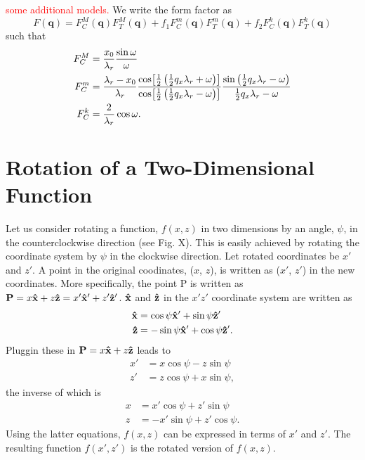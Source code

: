 \textcolor{red}{some additional models.} We write the form factor as
\begin{equation}
  F(\mathbf{q}) = F_C^M(\mathbf{q})F_T^M(\mathbf{q}) 
  + f_1F_C^m(\mathbf{q})F_T^m(\mathbf{q}) 
  + f_2F_C^k(\mathbf{q})F_T^k(\mathbf{q})
\end{equation}
such that
\begin{align}
  F_C^M &= \frac{x_0}{\lambda_r}\frac{\sin\omega}{\omega} \\
  F_C^m &= \frac{\lambda_r-x_0}{\lambda_r}
  \frac{\cos\mathopen{}\left[ \frac{1}{2}\left(\frac{1}{2}q_x\lambda_r + \omega\right) \right]\mathclose{}}
       {\cos\mathopen{}\left[ \frac{1}{2}\left(\frac{1}{2}q_x\lambda_r - \omega\right) \right]\mathclose{}}
  \frac{\sin\left(\frac{1}{2}q_x\lambda_r - \omega\right)}
       {\frac{1}{2}q_x\lambda_r - \omega} \\
  F_C^k &= \frac{2}{\lambda_r}\cos\omega.
\end{align}

\newpage
\section{Rotation of a Two-Dimensional Function}
Let us consider rotating a function, $f(x,z)$ in two dimensions by an angle, 
$\psi$, in the counterclockwise direction (see Fig. X). This is easily 
achieved by rotating the coordinate system by $\psi$ in the clockwise direction. 
Let rotated coordinates be $x'$ and $z'$. A point in the original coodinates,
($x$, $z$), is written as ($x'$, $z'$) in the new coordinates. More specifically,
the point P is written as 
$\mathbf{P}=x\mathbf{\hat{x}}+z\mathbf{\hat{z}}=x'\mathbf{\hat{x}}'+z'\mathbf{\hat{z}}'$. $\mathbf{\hat{x}}$ and $\mathbf{\hat{z}}$ in
the $x'z'$ coordinate system are written as 
\begin{align}
  \mathbf{\hat{x}} &= \cos\psi\mathbf{\hat{x}}'+\sin\psi\mathbf{\hat{z}}' \\
  \mathbf{\hat{z}} &= -\sin\psi\mathbf{\hat{x}}'+\cos\psi\mathbf{\hat{z}}'.
\end{align}
Pluggin these in $\mathbf{P}=x\mathbf{\hat{x}}+z\mathbf{\hat{z}}$ leads to
\begin{align}
  x' &= x\cos\psi - z\sin\psi \\
  z' &= z\cos\psi + x\sin\psi,
\end{align}
the inverse of which is
\begin{align}
  x &= x'\cos\psi + z'\sin\psi \\
  z &= -x'\sin\psi + z'\cos\psi.
\end{align}
Using the latter equations, $f(x,z)$ can be expressed in terms of $x'$ and $z'$. 
The resulting function $f(x',z')$ is the rotated version of $f(x,z)$. 

